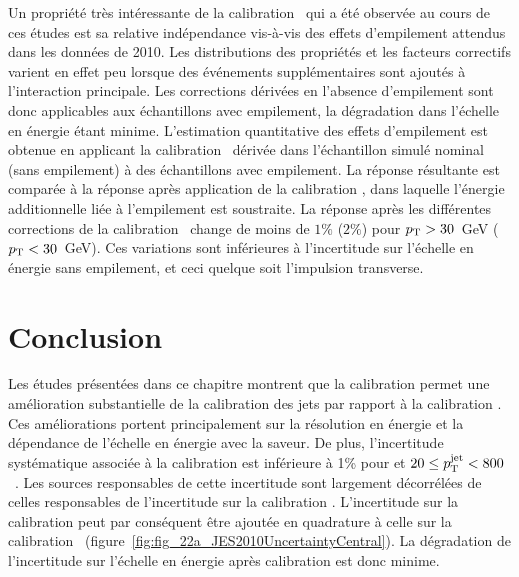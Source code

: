 Un propriété très intéressante de la calibration \GS~qui a été observée au cours de ces études est sa relative indépendance vis-à-vis des effets d'empilement attendus dans les données de 2010. 
Les distributions des propriétés et les facteurs correctifs varient en effet peu lorsque des événements supplémentaires sont ajoutés à l'interaction principale. 
Les corrections dérivées en l'absence d'empilement sont donc applicables aux échantillons avec empilement, la dégradation dans l'échelle en énergie étant minime. 
\enlargethispage{0.5cm}
L'estimation quantitative des effets d'empilement est obtenue en applicant la calibration \GS~dérivée dans l'échantillon simulé nominal (sans empilement) à des échantillons avec empilement. La réponse résultante est comparée à la réponse après application de la calibration \EMJES, dans laquelle l'énergie additionnelle liée à l'empilement est soustraite. La réponse après les différentes corrections de la calibration \GS~change de moins de $1\%$ ($2\%$) pour $p_{\mathrm{T}} > 30$~GeV ($p_{\mathrm{T}} < 30$~GeV). Ces variations sont inférieures à l'incertitude sur l'échelle en énergie sans empilement, et ceci quelque soit l'impulsion transverse.


\section{Conclusion}

Les \'etudes pr\'esent\'ees dans ce chapitre montrent que la calibration \GS{} permet une am\'elioration substantielle de la calibration des jets par rapport \`a la calibration \EMJES. 
Ces am\'eliorations portent principalement sur la r\'esolution en \'energie et la d\'ependance de l'\'echelle en \'energie avec la saveur. De plus, l'incertitude syst\'ematique associ\'ee \`a la calibration \GS{} est inf\'erieure \`a 1\% pour  et $20 \le p_{\mathrm{T}}^\mathrm{jet} < 800$~\GeV. Les sources responsables de cette incertitude sont largement d\'ecorr\'el\'ees de celles responsables de l'incertitude sur la calibration \EMJES. L'incertitude sur la calibration \GS{} peut par cons\'equent \^etre ajout\'ee en quadrature \`a celle sur la calibration \EMJES~(figure~\ref{fig:fig_22a_JES2010UncertaintyCentral}). La d\'egradation de l'incertitude sur l'\'echelle en \'energie apr\`es calibration \GS{} est donc minime. 

